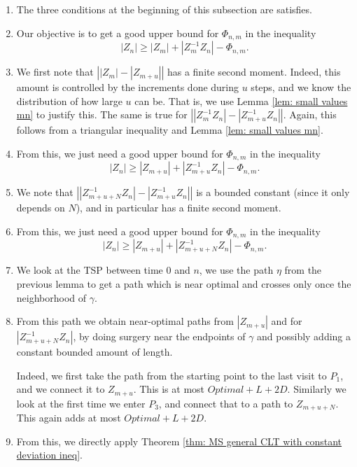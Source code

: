 \begin{enumerate}
	\item The three conditions at the beginning of this subsection are satisfies.
	\item Our objective is to get a good upper bound for $\Phi_{n,m}$ in the inequality
	\[|Z_n|\ge |Z_m|+|Z_{m}^{-1}Z_n|-\Phi_{n,m}. \]
	\item We first note that $\left| |Z_m|-|Z_{m+u}| \right|$ has a finite second moment. Indeed, this amount is controlled by the increments done during $u$ steps, and we know the distribution of how large $u$ can be. That is, we use Lemma \ref{lem: small values mn} to justify this.  The same is true for $\left| |Z_m^{-1}Z_n|-|Z_{m+u}^{-1}Z_n| \right|$. Again, this follows from a triangular inequality and Lemma \ref{lem: small values mn}.
	\item From this, we just need a good upper bound for $\Phi_{n,m}$ in the inequality
	\[|Z_n|\ge |Z_{m+u}|+|Z_{m+u}^{-1}Z_n|-\Phi_{n,m}. \]
	\item We note that $\left||Z_{m+u+N}^{-1}Z_n| -|Z_{m+u}^{-1}Z_n|\right|$ is a bounded constant (since it only depends on $N$), and in particular has a finite second moment.
	\item From this, we just need a good upper bound for $\Phi_{n,m}$ in the inequality
	\[|Z_n|\ge |Z_{m+u}|+|Z_{m+u+N}^{-1}Z_n|-\Phi_{n,m}. \]
	\item We look at the TSP between time $0$ and $n$, we use the path $\eta$ from the previous lemma to get a path which is near optimal and crosses only once the neighborhood of $\gamma$.
	\item From this path we obtain near-optimal paths from $|Z_{m+u}|$ and for $|Z_{m+u+N}^{-1}Z_n|$, by doing surgery near the endpoints of $\gamma$ and possibly adding a constant bounded amount of length.
	
	Indeed, we first take the path from the starting point to the last visit to $P_1$, and we connect it to $Z_{m+u}$. This is at most $Optimal+L+2D$. Similarly we look at the first time we enter $P_3$, and connect that to a path to $Z_{m+u+N}$. This again adds at most $Optimal+L+2D$.
	\item From this, we directly apply Theorem \ref{thm: MS general CLT with constant deviation ineq}.
\end{enumerate}
